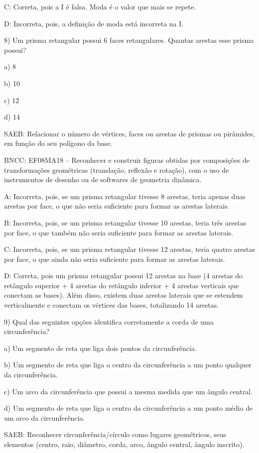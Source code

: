 C: Correta, pois a I é falsa. Moda é o valor que mais se repete.

D: Incorreta, pois, a definição de moda está incorreta na I.

8) Um prisma retangular possui 6 faces retangulares. Quantas arestas
esse prisma possui?

a) 8

b) 10

c) 12

d) 14

SAEB: Relacionar o número de vértices, faces ou arestas de prismas ou
pirâmides, em função do seu polígono da base.

BNCC: EF08MA18 -- Reconhecer e construir figuras obtidas por composições
de transformações geométricas (translação, reflexão e rotação), com o
uso de instrumentos de desenho ou de softwares de geometria dinâmica.

A: Incorreta, pois, se um prisma retangular tivesse 8 arestas, teria
apenas duas arestas por face, o que não seria suficiente para formar as
arestas laterais.

B: Incorreta, pois, se um prisma retangular tivesse 10 arestas, teria
três arestas por face, o que também não seria suficiente para formar as
arestas laterais.

C: Incorreta, pois, se um prisma retangular tivesse 12 arestas, teria
quatro arestas por face, o que ainda não seria suficiente para formar as
arestas laterais.

D: Correta, pois um prisma retangular possui 12 arestas na base (4
arestas do retângulo superior + 4 arestas do retângulo inferior + 4
arestas verticais que conectam as bases). Além disso, existem duas
arestas laterais que se estendem verticalmente e conectam os vértices
das bases, totalizando 14 arestas.

9) Qual das seguintes opções identifica corretamente a corda de uma
circunferência?

a) Um segmento de reta que liga dois pontos da circunferência.

b) Um segmento de reta que liga o centro da circunferência a um ponto
qualquer da circunferência.

c) Um arco da circunferência que possui a mesma medida que um ângulo
central.

d) Um segmento de reta que liga o centro da circunferência a um ponto
médio de um arco da circunferência.

SAEB: Reconhecer circunferência/círculo como lugares geométricos, seus
elementos (centro, raio, diâmetro, corda, arco, ângulo central, ângulo
inscrito).

